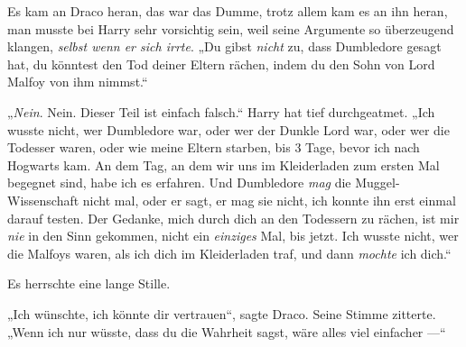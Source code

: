 Es kam an Draco heran, das war das Dumme, trotz allem kam es an ihn heran, man musste bei Harry sehr vorsichtig sein, weil seine Argumente so überzeugend klangen, \emph{selbst wenn er sich irrte}.
„Du gibst \emph{nicht} zu, dass Dumbledore gesagt hat, du könntest den Tod deiner Eltern rächen, indem du den Sohn von Lord Malfoy von ihm nimmst.“

„\emph{Nein}. Nein. Dieser Teil ist einfach falsch.“ Harry hat tief durchgeatmet.
„Ich wusste nicht, wer Dumbledore war, oder wer der Dunkle Lord war, oder wer die Todesser waren, oder wie meine Eltern starben, bis 3 Tage, bevor ich nach Hogwarts kam. An dem Tag, an dem wir uns im Kleiderladen zum ersten Mal begegnet sind, habe ich es erfahren. Und Dumbledore \emph{mag} die Muggel-Wissenschaft nicht mal, oder er sagt, er mag sie nicht, ich konnte ihn erst einmal darauf testen. Der Gedanke, mich durch dich an den Todessern zu rächen, ist mir \emph{nie} in den Sinn gekommen, nicht ein \emph{einziges} Mal, bis jetzt. Ich wusste nicht, wer die Malfoys waren, als ich dich im Kleiderladen traf, und dann \emph{mochte} ich dich.“

Es herrschte eine lange Stille.

„Ich wünschte, ich könnte dir vertrauen“, sagte Draco. Seine Stimme zitterte.
„Wenn ich nur wüsste, dass du die Wahrheit sagst, wäre alles viel einfacher —“

